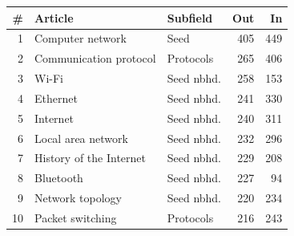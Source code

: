 
\begin{tabular}{rllrr}
\toprule
\# & Article & Subfield & Out & In\\
\midrule
1 & Computer network & Seed & 405 & 449\\
2 & Communication protocol & Protocols & 265 & 406\\
3 & Wi-Fi & Seed nbhd. & 258 & 153\\
4 & Ethernet & Seed nbhd. & 241 & 330\\
5 & Internet & Seed nbhd. & 240 & 311\\
6 & Local area network & Seed nbhd. & 232 & 296\\
7 & History of the Internet & Seed nbhd. & 229 & 208\\
8 & Bluetooth & Seed nbhd. & 227 & 94\\
9 & Network topology & Seed nbhd. & 220 & 234\\
10 & Packet switching & Protocols & 216 & 243\\
\bottomrule
\end{tabular}
